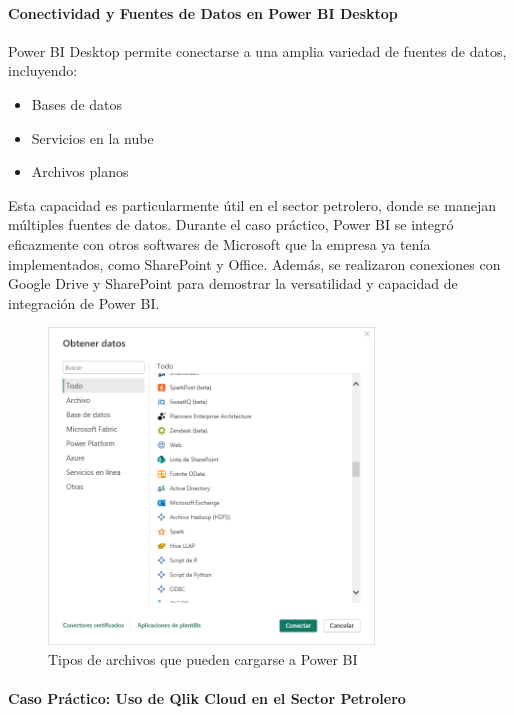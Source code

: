 \documentclass[
  11pt,
  bookmarksnumbered]{article}
\begin{document}
\hypertarget{conectividad-y-fuentes-de-datos-en-power-bi-desktop}{%
\paragraph{Conectividad y Fuentes de Datos en Power BI Desktop}\label{conectividad-y-fuentes-de-datos-en-power-bi-desktop}}

Power BI Desktop permite conectarse a una amplia variedad de fuentes de datos, incluyendo:

\begin{itemize}
\item
  Bases de datos
\item
  Servicios en la nube
\item
  Archivos planos
\end{itemize}

Esta capacidad es particularmente útil en el sector petrolero, donde se manejan múltiples fuentes de datos.
Durante el caso práctico, Power BI se integró eficazmente con otros softwares de Microsoft que la empresa ya tenía implementados, como SharePoint y Office.
Además, se realizaron conexiones con Google Drive y SharePoint para demostrar la versatilidad y capacidad de integración de Power BI.

\begin{figure}

{\centering \includegraphics[width=3.41in]{media 2/image6} 

}

\caption{Tipos de archivos que pueden cargarse a Power BI}\label{fig:unnamed-chunk-10}
\end{figure}

\hypertarget{caso-pruxe1ctico-uso-de-qlik-cloud-en-el-sector-petrolero}{%
\paragraph{Caso Práctico: Uso de Qlik Cloud en el Sector Petrolero}\label{caso-pruxe1ctico-uso-de-qlik-cloud-en-el-sector-petrolero}}
\end{document}
